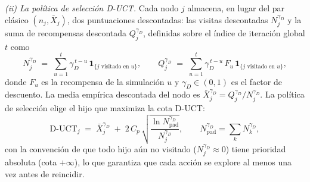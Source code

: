 \smallskip
\emph{(ii) La política de selección D-UCT.}
Cada nodo $j$ almacena, en lugar del par clásico $(n_j,\bar{X}_j)$, dos puntuaciones descontadas: las visitas descontadas $N_j^{\gamma_D}$ y la suma de recompensas descontada $Q_j^{\gamma_D}$, definidas sobre el índice de iteración global $t$ como
\begin{equation} \label{eq:duct-stats}
    N_j^{\gamma_D} \;=\; \sum_{u=1}^{t} \gamma_D^{\,t-u}\,\mathbf{1}_{\{j \text{ visitado en } u\}},
    \qquad
    Q_j^{\gamma_D} \;=\; \sum_{u=1}^{t} \gamma_D^{\,t-u}\,F_u\,\mathbf{1}_{\{j \text{ visitado en } u\}},
\end{equation}
donde $F_u$ es la recompensa de la simulación $u$ y $\gamma_D\in(0,1)$ es el factor de descuento. La media empírica descontada del nodo es $\bar{X}_j^{\gamma_D}=Q_j^{\gamma_D}/N_j^{\gamma_D}$. La política de selección elige el hijo que maximiza la cota D-UCT:
\begin{equation} \label{eq:duct}
    \mathrm{D\text{-}UCT}_j \;=\; \bar{X}_j^{\gamma_D} \;+\; 2\,C_p\,\sqrt{\frac{\ln N_{\mathrm{pad}}^{\gamma_D}}{N_j^{\gamma_D}}},
    \qquad
    N_{\mathrm{pad}}^{\gamma_D}=\sum_{k} N_k^{\gamma_D},
\end{equation}
con la convención de que todo hijo aún no visitado ($N_j^{\gamma_D}\approx 0$) tiene prioridad absoluta (cota $+\infty$), lo que garantiza que cada acción se explore al menos una vez antes de reincidir. 


